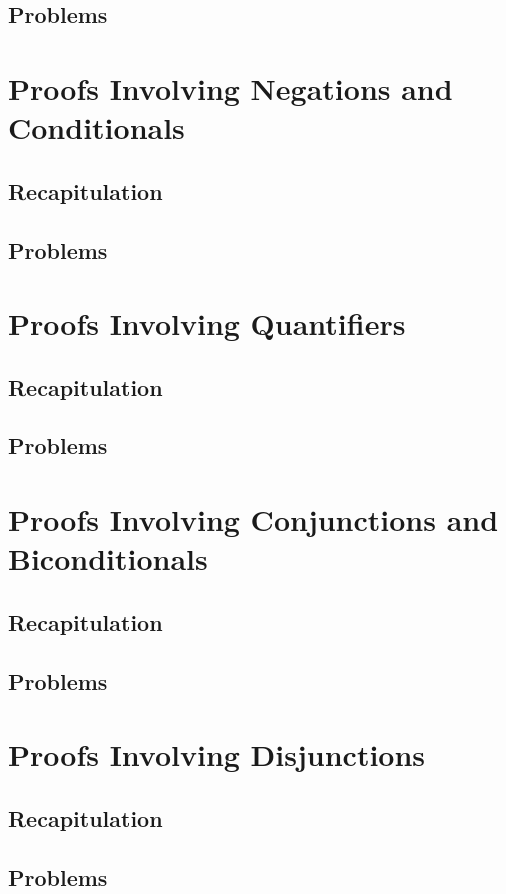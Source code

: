 \documentclass{report}
\begin{document}
        \subsection{Problems}
        
    \section{Proofs Involving Negations and Conditionals}
        \subsection{Recapitulation}
        \subsection{Problems}
    \section{Proofs Involving Quantifiers}
        \subsection{Recapitulation}
        \subsection{Problems}
    \section{Proofs Involving Conjunctions and Biconditionals}
        \subsection{Recapitulation}
        \subsection{Problems}
    \section{Proofs Involving Disjunctions}
        \subsection{Recapitulation}
        \subsection{Problems}
\end{document}
